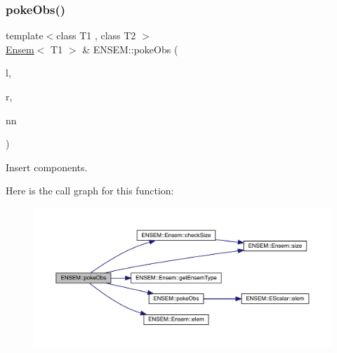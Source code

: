 \subsubsection{\texorpdfstring{pokeObs()}{pokeObs()}\hspace{0.1cm}{\footnotesize\ttfamily [2/2]}}
{\footnotesize\ttfamily template$<$class T1 , class T2 $>$ \\
\mbox{\hyperlink{classENSEM_1_1Ensem}{Ensem}}$<$ T1 $>$ \& E\+N\+S\+E\+M\+::poke\+Obs (\begin{DoxyParamCaption}\item[{\mbox{\hyperlink{classENSEM_1_1Ensem}{Ensem}}$<$ T1 $>$ \&}]{l,  }\item[{const \mbox{\hyperlink{classENSEM_1_1Ensem}{Ensem}}$<$ T2 $>$ \&}]{r,  }\item[{const \mbox{\hyperlink{classXMLArray_1_1Array}{Array}}$<$ int $>$ \&}]{nn }\end{DoxyParamCaption})\hspace{0.3cm}{\ttfamily [inline]}}



Insert components. 

Here is the call graph for this function\+:\nopagebreak
\begin{figure}[H]
\begin{center}
\leavevmode
\includegraphics[width=350pt]{d1/d9e/group__eensem_gaf4969f408bf59ed0fb219c61def36156_cgraph}
\end{center}
\end{figure}
\mbox{\label{group__eensem_ga20ff818f34faa2f1d5067da3ff139ba9}} 

